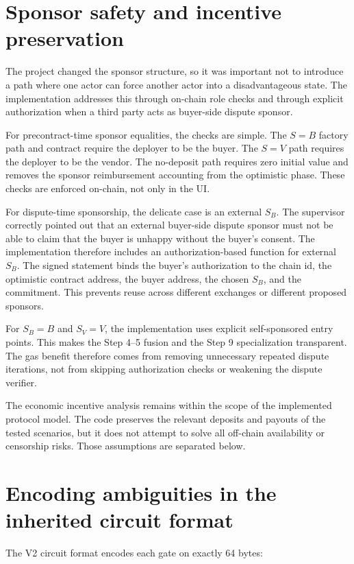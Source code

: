 \section{Sponsor safety and incentive preservation}

The project changed the sponsor structure, so it was important not to introduce a path where
one actor can force another actor into a disadvantageous state. The implementation addresses
this through on-chain role checks and through explicit authorization when a third party acts
as buyer-side dispute sponsor.

For precontract-time sponsor equalities, the checks are simple. The \(S=B\) factory path and
contract require the deployer to be the buyer. The \(S=V\) path requires the deployer to be
the vendor. The no-deposit path requires zero initial value and removes the sponsor
reimbursement accounting from the optimistic phase. These checks are enforced on-chain, not
only in the UI.

For dispute-time sponsorship, the delicate case is an external \(S_B\). The supervisor
correctly pointed out that an external buyer-side dispute sponsor must not be able to claim
that the buyer is unhappy without the buyer's consent. The implementation therefore includes
an authorization-based function for external \(S_B\). The signed statement binds the buyer's
authorization to the chain id, the optimistic contract address, the buyer address, the
chosen \(S_B\), and the commitment. This prevents reuse across different exchanges or
different proposed sponsors.

For \(S_B=B\) and \(S_V=V\), the implementation uses explicit self-sponsored entry points.
This makes the Step 4--5 fusion and the Step 9 specialization transparent. The gas benefit
therefore comes from removing unnecessary repeated dispute iterations, not from skipping
authorization checks or weakening the dispute verifier.

The economic incentive analysis remains within the scope of the implemented protocol model.
The code preserves the relevant deposits and payouts of the tested scenarios, but it does
not attempt to solve all off-chain availability or censorship risks. Those assumptions are
separated below.

\section{Encoding ambiguities in the inherited circuit format}

The V2 circuit format encodes each gate on exactly 64 bytes:

